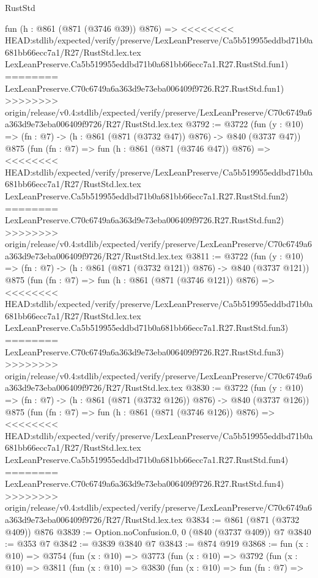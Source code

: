 \begin{lexlean}{RustStd}
\begin{coremodule}
{\begin{coremodule}
{{{{{{{{{    fun (h : @861 (@871 (@3746 @39)) @876) =>
<<<<<<<< HEAD:stdlib/expected/verify/preserve/LexLeanPreserve/Ca5b519955eddbd71b0a681bb66ecc7a1/R27/RustStd.lex.tex
    LexLeanPreserve.Ca5b519955eddbd71b0a681bb66ecc7a1.R27.RustStd.fun1)
========
    LexLeanPreserve.C70c6749a6a363d9e73eba006409f9726.R27.RustStd.fun1)
>>>>>>>> origin/release/v0.4:stdlib/expected/verify/preserve/LexLeanPreserve/C70c6749a6a363d9e73eba006409f9726/R27/RustStd.lex.tex
@3792 := @3722
    (fun (y : @10) => (fn : @7) -> (h : @861 (@871 (@3732 @47)) @876) -> @840 (@3737 @47))
    @875
    (fun (fn : @7) =>
    fun (h : @861 (@871 (@3746 @47)) @876) =>
<<<<<<<< HEAD:stdlib/expected/verify/preserve/LexLeanPreserve/Ca5b519955eddbd71b0a681bb66ecc7a1/R27/RustStd.lex.tex
    LexLeanPreserve.Ca5b519955eddbd71b0a681bb66ecc7a1.R27.RustStd.fun2)
========
    LexLeanPreserve.C70c6749a6a363d9e73eba006409f9726.R27.RustStd.fun2)
>>>>>>>> origin/release/v0.4:stdlib/expected/verify/preserve/LexLeanPreserve/C70c6749a6a363d9e73eba006409f9726/R27/RustStd.lex.tex
@3811 := @3722
    (fun (y : @10) => (fn : @7) -> (h : @861 (@871 (@3732 @121)) @876) -> @840 (@3737 @121))
    @875
    (fun (fn : @7) =>
    fun (h : @861 (@871 (@3746 @121)) @876) =>
<<<<<<<< HEAD:stdlib/expected/verify/preserve/LexLeanPreserve/Ca5b519955eddbd71b0a681bb66ecc7a1/R27/RustStd.lex.tex
    LexLeanPreserve.Ca5b519955eddbd71b0a681bb66ecc7a1.R27.RustStd.fun3)
========
    LexLeanPreserve.C70c6749a6a363d9e73eba006409f9726.R27.RustStd.fun3)
>>>>>>>> origin/release/v0.4:stdlib/expected/verify/preserve/LexLeanPreserve/C70c6749a6a363d9e73eba006409f9726/R27/RustStd.lex.tex
@3830 := @3722
    (fun (y : @10) => (fn : @7) -> (h : @861 (@871 (@3732 @126)) @876) -> @840 (@3737 @126))
    @875
    (fun (fn : @7) =>
    fun (h : @861 (@871 (@3746 @126)) @876) =>
<<<<<<<< HEAD:stdlib/expected/verify/preserve/LexLeanPreserve/Ca5b519955eddbd71b0a681bb66ecc7a1/R27/RustStd.lex.tex
    LexLeanPreserve.Ca5b519955eddbd71b0a681bb66ecc7a1.R27.RustStd.fun4)
========
    LexLeanPreserve.C70c6749a6a363d9e73eba006409f9726.R27.RustStd.fun4)
>>>>>>>> origin/release/v0.4:stdlib/expected/verify/preserve/LexLeanPreserve/C70c6749a6a363d9e73eba006409f9726/R27/RustStd.lex.tex
@3834 := @861 (@871 (@3732 @409)) @876
@3839 := Option.noConfusion.{0, 0} (@840 (@3737 @409)) @7
@3840 := @353 @7
@3842 := @3839 @3840 @7
@3843 := @874 @919
@3868 := fun (x : @10) =>
  @3754
    (fun (x : @10) =>
    @3773
      (fun (x : @10) =>
      @3792
        (fun (x : @10) =>
        @3811
          (fun (x : @10) =>
          @3830
            (fun (x : @10) =>
            fun (fn : @7) =>
}}}}}}}}}
\end{coremodule}}
\end{coremodule}
\end{lexlean}
